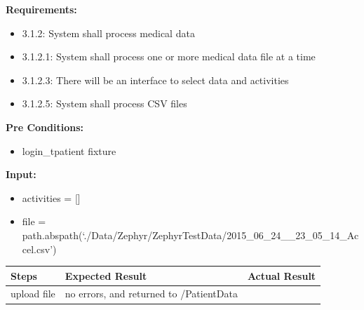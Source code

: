 \documentclass[letterpaper,10pt,english]{sphinxmanual}
\begin{document}
\begin{fulllineitems}
\label{STD/test_upload:test_upload.test_single_file_no_activity}
\textbf{Requirements:}
\begin{itemize}
\item {} 
3.1.2: System shall process medical data

\item {} 
3.1.2.1: System shall process one or more medical data file at a time

\item {} 
3.1.2.3: There will be an interface to select data and activities

\item {} 
3.1.2.5: System shall process CSV files

\end{itemize}

\textbf{Pre Conditions:}
\begin{itemize}
\item {} 
login\_tpatient fixture

\end{itemize}

\textbf{Input:}
\begin{itemize}
\item {} 
activities = {[}{]}

\item {} 
file = path.abspath(`./Data/Zephyr/ZephyrTestData/2015\_06\_24\_\_23\_05\_14\_Accel.csv')

\end{itemize}

\begin{tabulary}{\linewidth}{|L|L|L|}
\hline
\textsf{\relax 
Steps
} & \textsf{\relax 
Expected Result
} & \textsf{\relax 
Actual Result
}\\
\hline
upload file
 & 
no errors, and returned to /PatientData
 & \\
\hline\end{tabulary}


\end{fulllineitems}

\end{document}

